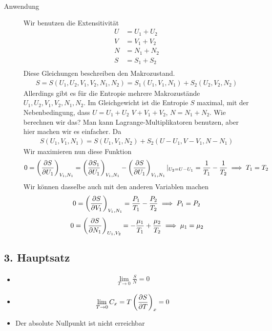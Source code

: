 \begin{description}
  \item[Anwendung] Wir benutzen die Extensitivität
    \begin{align*}
      U &= U_1 + U_2 \\
      V &= V_1 + V_2 \\
      N &= N_1 + N_2 \\
      S &= S_1 + S_2 \\
    \end{align*}
    Diese Gleichungen beschreiben den Makrozustand.
    \begin{align*}
      S = S(U_1, U_2, V_1, V_2, N_1, N_2) = S_1 (U_1, V_1, N_1) + 
      S_2 ( U_2, V_2, N_2)
    \end{align*}
    Allerdings gibt es für die Entropie mehrere Makrozustände 
    $U_1, U_2, V_1, V_2, N_1, N_2$.
    Im Gleichgewicht ist die Entropie $S$ maximal, mit der Nebenbedingung, 
    dass $U = U_1 + U_2$ $V + V_1 + V_2$, $N = N_1 + N_2$.
    Wie berechnen wir das? Man kann Lagrange-Multiplikatoren benutzen, aber
    hier machen wir es einfacher. Da
    \begin{align*}
      S(U_1, V_1, N_1) = S (U_1, V_1, N_2) + S_2 (U- U_1, V- V_1, N- N_1)
    \end{align*}
    Wir maximieren nun diese Funktion
    \begin{align*}
      0 = \left( \frac{\partial S }{\partial U_1} \right)_{V_1, N_1} = \left( \frac{\partial S_1 }{\partial U_1} \right)_{V_1, N_1}
      - \left( \frac{\partial S }{\partial U_1} \right)_{V_1, N_1} |_{U_2 = U - U_1}
      =\frac{1}{T_1} -\frac{1}{T_2} \implies T_1 = T_2
    \end{align*}
    Wir können dasselbe auch mit den anderen Variablen machen
    \begin{align*}
     0 =  \left( \frac{\partial S }{\partial V_1} \right)_{V_1, N_1} =\frac{P_1}{T_1} -\frac{P_2}{T_2}
     \implies P_1 = P_2
    \end{align*}
    \begin{align*}
      0 = \left( \frac{\partial S }{\partial N_1} \right)_{U_1, V_2} = -\frac{ \mu_1}{T_1} + 
\frac{      \mu_2}{T_2} \implies \mu_1 = \mu_2
    \end{align*}
    
    
\end{description}
\subsection*{3. Hauptsatz}
\begin{itemize}
  \item %
    \begin{align*}
      \lim_{T\to  0 } 
      \frac{    S}{N} = 0
    \end{align*}
  \item %
    \begin{align*}
      \lim_{T \to 0}
      C_x = T \left( \frac{\partial S }{\partial T} \right)_{x} = 0
    \end{align*}
  \item Der absolute Nullpunkt ist nicht erreichbar
\end{itemize}



